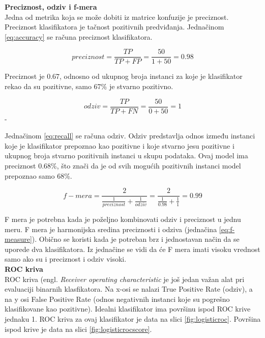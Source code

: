 \documentclass[a4paper,12pt]{report}
\begin{document}
\textbf{Preciznost, odziv i f-mera}\\

Jedna od metrika koja se može dobiti iz matrice konfuzije je preciznost. Preciznost klasifikatora je tačnost pozitivnih predviđanja. Jednačinom \ref{eq:accuracy} se računa preciznost klasifikatora. 

\begin{equation} \label{eq:accuracy}
	preciznost = \frac{TP}{TP + FP} = \frac{50}{1 + 50} = 0.98
\end{equation}

Preciznost je 0.67, odnosno od ukupnog broja instanci za koje je klasifikator rekao da su pozitivne, samo 67\% je stvarno pozitivno. 

\begin{equation} \label{eq:recall}
	odziv = \frac{TP}{TP + FN} = \frac{50}{0 + 50} = 1
\end{equation}-

Jednačinom \ref{eq:recall} se računa odziv. Odziv predstavlja odnos između instanci koje je klasifikator prepoznao kao pozitivne i koje stvarno jesu pozitivne i ukupnog broja stvarno pozitivnih instanci u skupu podataka. Ovaj model ima preciznost 0.68\%, što znači da je od svih mogućih pozitivnih instanci model prepoznao samo 68\%.

\begin{equation} \label{eq:f-measure}
	f-mera = \frac{2}{\frac{1}{preciznost} + \frac{1}{odziv}} =  \frac{2}{\frac{1}{0.98} + \frac{1}{1}} = 0.99
\end{equation}

F mera je potrebna kada je poželjno kombinovati odziv i preciznost u jednu meru. F mera je harmonijska sredina preciznosti i odziva (jednačina \ref{eq:f-measure}). Obično se koristi kada je potreban brz i jednostavan način da se uporede dva klasifikatora. Iz jednačine se vidi da će F mera imati visoku vrednost samo ako su i preciznost i odziv visoki. \\

\textbf{ROC kriva}\\

ROC kriva (engl. \textit{Receiver operating characteristic} je još jedan važan alat pri evaluaciji binarnih klasfikatora. Na x-osi se nalazi True Positive Rate (odziv), a na y osi False Positive Rate (odnos negativnih instanci koje su pogrešno klasifikovane kao pozitivne). Idealni klasifikator ima površinu ispod ROC krive jednaku 1. ROC kriva za ovaj klasifikator je data na slici \ref{fig:logisticroc}. Površina ispod krive je data na slici \ref{fig:logisticrocscore}.\\
\end{document}

